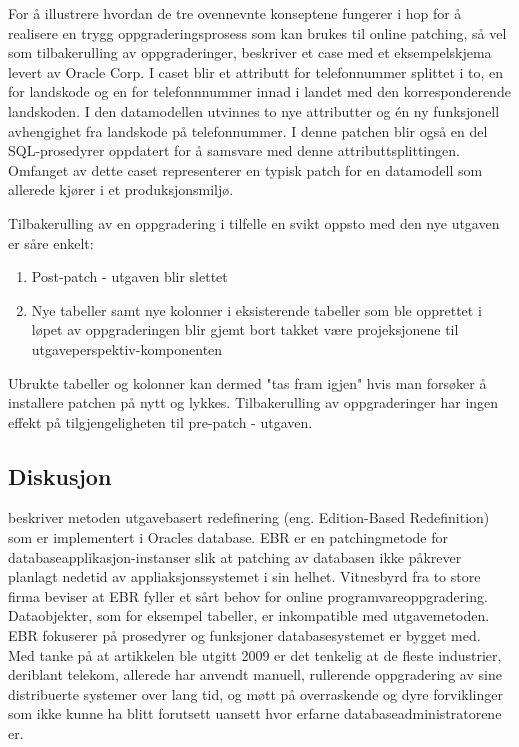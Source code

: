 For å illustrere hvordan de tre ovennevnte konseptene fungerer i hop for å realisere en trygg oppgraderingsprosess som kan brukes til online patching, så vel som tilbakerulling av oppgraderinger, beskriver \cite{choi2009} et case med et eksempelskjema levert av Oracle Corp. I caset blir et attributt for telefonnummer splittet i to, en for landskode og en for telefonnnummer innad i landet med den korresponderende landskoden. I den datamodellen utvinnes to nye attributter og én ny funksjonell avhengighet fra landskode på telefonnummer. I denne patchen blir også en del SQL-prosedyrer oppdatert for å samsvare med denne attributtsplittingen. Omfanget av dette caset representerer en typisk patch for en datamodell som allerede kjører i et produksjonsmiljø.

Tilbakerulling av en oppgradering i tilfelle en svikt oppsto med den nye utgaven er såre enkelt:
\begin{enumerate}
  \item Post-patch - utgaven blir slettet
  \item Nye tabeller samt nye kolonner i eksisterende tabeller som ble opprettet i løpet av oppgraderingen blir gjemt bort takket være projeksjonene til utgaveperspektiv-komponenten
\end{enumerate}

Ubrukte tabeller og kolonner kan dermed "tas fram igjen" hvis man forsøker å installere patchen på nytt og lykkes. Tilbakerulling av oppgraderinger har ingen effekt på tilgjengeligheten til pre-patch - utgaven.

\subsection{Diskusjon}
\cite{choi2009} beskriver metoden utgavebasert redefinering (eng. Edition-Based Redefinition) som er implementert i Oracles database. EBR er en patchingmetode for databaseapplikasjon-instanser slik at patching av databasen ikke påkrever planlagt nedetid av appliaksjonssystemet i sin helhet. Vitnesbyrd fra to store firma beviser at EBR fyller et sårt behov for online programvareoppgradering. Dataobjekter, som for eksempel tabeller, er inkompatible med utgavemetoden. EBR fokuserer på prosedyrer og funksjoner databasesystemet er bygget med. Med tanke på at artikkelen ble utgitt 2009 er det tenkelig at de fleste industrier, deriblant telekom, allerede har anvendt manuell, rullerende oppgradering av sine distribuerte systemer over lang tid, og møtt på overraskende og dyre forviklinger som ikke kunne ha blitt forutsett uansett hvor erfarne databaseadministratorene er.

